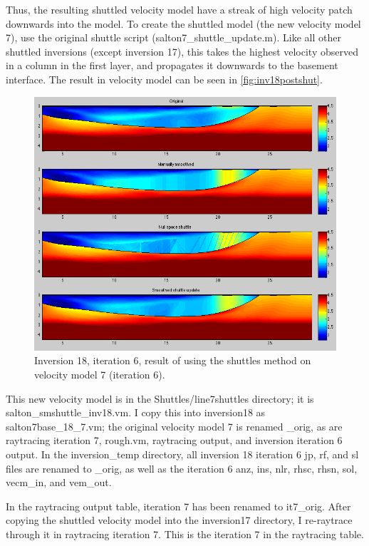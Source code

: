 \documentclass[fontsize=11pt, %
                             paper=a4, %
                             twoside, %
                             captions=tableheading,
                             index=totoc,
                             hyperref]{labbook}
\begin{document}
\begin{addmargin}[4cm]{0cm}
Thus, the resulting shuttled velocity model have a streak of high velocity patch downwards into the model.  To create the shuttled model (the new velocity model 7), use the original shuttle script (salton7\_shuttle\_update.m).
Like all other shuttled inversions (except inversion 17), this takes the highest velocity observed in a  column in the first layer, and propagates it downwards to the basement interface.  The result in velocity model can be seen in \autoref{fig:inv18postshut}.

\begin{figure}[h!]
\raggedleft
\includegraphics[scale=0.5,keepaspectratio=true]{figs/inv18_postshuttle.png}
\caption{Inversion 18, iteration 6, result of using the shuttles method on velocity model 7 (iteration 6).}
\label{fig:inv18postshut}
\end{figure} 
 
 This new velocity model is in the Shuttles/line7shuttles directory; it is salton\_smshuttle\_inv18.vm.  I copy this into inversion18 as salton7base\_18\_7.vm; the original velocity model 7 is renamed \_orig, as are raytracing iteration 7, rough.vm, raytracing output, and inversion iteration 6 output.  In the inversion\_temp directory, all inversion 18 iteration 6 jp, rf, and sl files are renamed to \_orig, as well as the iteration 6 anz, ins, nlr, rhsc, rhsn, sol, vecm\_in, and vem\_out.  
 
 In the raytracing output table, iteration 7 has been renamed to it7\_orig.  After copying the shuttled velocity model into the inversion17 directory, I re-raytrace through it in raytracing iteration 7.  This is the iteration 7 in the raytracing table.  
 

\end{addmargin}
\end{document}
